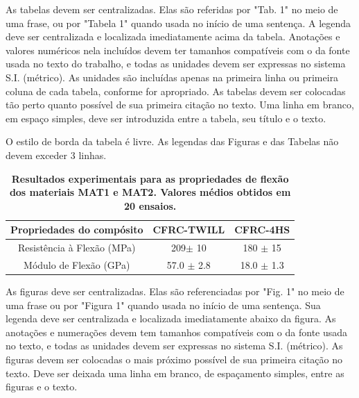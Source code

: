 \documentclass[10pt,fleqn,a4paper]{article}
\begin{document}
        As tabelas devem ser centralizadas. Elas são referidas por "Tab. 1" no meio de uma frase, ou por "Tabela 1" quando usada no início de uma sentença. A legenda deve ser centralizada e localizada imediatamente acima da tabela. Anotações e valores numéricos nela incluídos devem ter tamanhos compatíveis com o da fonte usada no texto do trabalho, e todas as unidades devem ser expressas no sistema S.I. (métrico). As unidades são incluídas apenas na primeira linha ou primeira coluna de cada tabela, conforme for apropriado. As tabelas devem ser colocadas tão perto quanto possível de sua primeira citação no texto. Uma linha em branco, em espaço simples, deve ser introduzida entre a tabela, seu título e o texto.

        O estilo de borda da tabela é livre. As legendas das Figuras e das Tabelas não devem exceder 3 linhas.

        \begin{table}[ht]
            \begin{center}
                \caption{\textbf{Resultados experimentais para as propriedades de flexão dos materiais MAT1 e MAT2. Valores médios obtidos em 20 ensaios.}}
                    \begin{tabular}{|c|c|c|}
                    \hline
                    Propriedades do compósito       & CFRC-TWILL        & CFRC-4HS         \\
                    \hline
                    Resistência à Flexão  (MPa)     & 209$\pm$ 10       & 180 $\pm$  15    \\
                    \hline
                    Módulo de Flexão  (GPa)         & 57.0 $\pm$ 2.8    & 18.0 $\pm$  1.3  \\
                    \hline
                    \end{tabular}
            \end{center}
        \end{table}

        As figuras deve ser centralizadas. Elas são referenciadas por "Fig. 1" no meio de uma frase ou por "Figura 1" quando usada no início de uma sentença. Sua legenda deve ser centralizada e localizada imediatamente abaixo da figura. As anotações e numerações devem tem tamanhos compatíveis com o da fonte usada no texto, e todas as unidades devem ser expressas no sistema S.I. (métrico). As figuras devem ser colocadas o mais próximo possível de sua primeira citação no texto. Deve ser deixada uma linha em branco, de espaçamento simples, entre as figuras e o texto.
    
\end{document}
